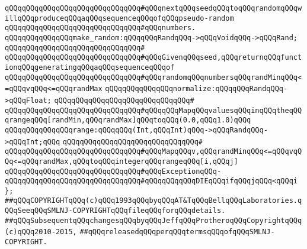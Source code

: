 \verb|qQQqqQQqqQQqqQQqqQQqqQQqqQQqqQQq#qQQqnextqQQqseedqQQqtoqQQqrandomqQQqwillqQQqproduceqQQqaqQQqsequenceqQQqofqQQqpseudo-random|\newline
\verb|qQQqqQQqqQQqqQQqqQQqqQQqqQQqqQQq#qQQqnumbers.|\newline
\newline
\newline
\verb|qQQqqQQqqQQqqQQqmake_random:qQQqqQQqRandqQQq->qQQqVoidqQQq->qQQqRand;|\newline
\verb|qQQqqQQqqQQqqQQqqQQqqQQqqQQqqQQq#|\newline
\verb|qQQqqQQqqQQqqQQqqQQqqQQqqQQqqQQq#qQQqGivenqQQqseed,qQQqreturnqQQqfunctionqQQqgeneratingqQQqaqQQqsequenceqQQqof|\newline
\verb|qQQqqQQqqQQqqQQqqQQqqQQqqQQqqQQq#qQQqrandomqQQqnumbersqQQqrandMinqQQq<=qQQqvqQQq<=qQQqrandMax|\newline
\newline
\newline
\verb|qQQqqQQqqQQqqQQqnormalize:qQQqqQQqRandqQQq->qQQqFloat;|\newline
\verb|qQQqqQQqqQQqqQQqqQQqqQQqqQQqqQQq#|\newline
\verb|qQQqqQQqqQQqqQQqqQQqqQQqqQQqqQQq#qQQqqQQqMapqQQqvaluesqQQqinqQQqtheqQQqrangeqQQq[randMin,qQQqrandMax]qQQqtoqQQq(0.0,qQQq1.0)qQQq|\newline
\newline
\verb|qQQqqQQqqQQqqQQqrange:qQQqqQQq(Int,qQQqInt)qQQq->qQQqRandqQQq->qQQqInt;qQQq|\newline
\verb|qQQqqQQqqQQqqQQqqQQqqQQqqQQqqQQq#|\newline
\verb|qQQqqQQqqQQqqQQqqQQqqQQqqQQqqQQq#qQQqMapqQQqv,qQQqrandMinqQQq<=qQQqvqQQq<=qQQqrandMax,qQQqtoqQQqintegerqQQqrangeqQQq[i,qQQqj]|\newline
\verb|qQQqqQQqqQQqqQQqqQQqqQQqqQQqqQQq#qQQqExceptionqQQq-|\newline
\verb|qQQqqQQqqQQqqQQqqQQqqQQqqQQqqQQq#qQQqqQQqqQQqDIEqQQqifqQQqjqQQq<qQQqi|\newline
\newline
\newline
\verb|};|\newline
\newline
\newline
\newline
\verb|##qQQqCOPYRIGHTqQQq(c)qQQq1993qQQqbyqQQqAT&TqQQqBellqQQqLaboratories.qQQqSeeqQQqSMLNJ-COPYRIGHTqQQqfileqQQqforqQQqdetails.|\newline
\verb|##qQQqSubsequentqQQqchangesqQQqbyqQQqJeffqQQqProtheroqQQqCopyrightqQQq(c)qQQq2010-2015,|\newline
\verb|##qQQqreleasedqQQqperqQQqtermsqQQqofqQQqSMLNJ-COPYRIGHT.|\newline

